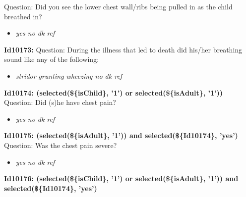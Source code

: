 \documentclass{article}%
\begin{document}
Question: Did you see the lower chest wall/ribs being pulled in as the child breathed in?\newline%
%
\begin{itemize}%
\item%
\textit{yes\newline%
 no\newline%
 dk\newline%
 ref\newline%
}%
\end{itemize}%
\textbf{Id10173: \newline%
}%
Question: During the illness that led to death did his/her breathing sound like any of the following:\newline%
%
\begin{itemize}%
\item%
\textit{stridor\newline%
 grunting\newline%
 wheezing\newline%
 no\newline%
 dk\newline%
 ref\newline%
}%
\end{itemize}%
\textbf{Id10174: (selected(\$\{isChild\}, '1') or selected(\$\{isAdult\}, '1')) \newline%
}%
Question: Did (s)he have chest pain?\newline%
%
\begin{itemize}%
\item%
\textit{yes\newline%
 no\newline%
 dk\newline%
 ref\newline%
}%
\end{itemize}%
\textbf{Id10175: (selected(\$\{isAdult\}, '1')) and selected(\$\{Id10174\}, 'yes')\newline%
}%
Question: Was the chest pain severe?\newline%
%
\begin{itemize}%
\item%
\textit{yes\newline%
 no\newline%
 dk\newline%
 ref\newline%
}%
\end{itemize}%
\textbf{Id10176: (selected(\$\{isChild\}, '1') or selected(\$\{isAdult\}, '1')) and selected(\$\{Id10174\}, 'yes')\newline%
}%
\end{document}

